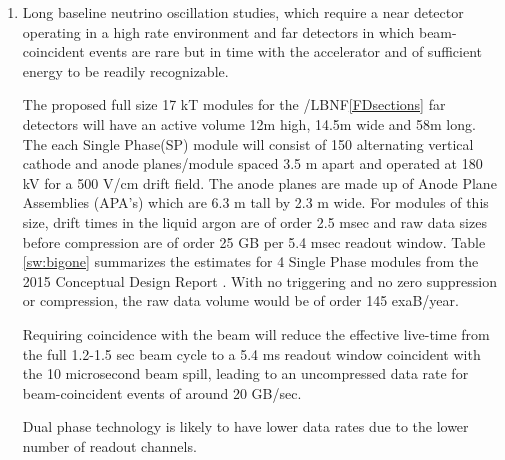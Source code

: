 \begin{enumerate}
\item Long baseline neutrino oscillation studies, which require a near detector operating in a high rate environment and far detectors in which beam-coincident events are rare but in time with the accelerator and of sufficient energy to be readily recognizable.  

The proposed  full size 17 kT modules for the  /LBNF\ref{FDsections} far detectors will  have an active volume 12m high, 14.5m wide and 58m long.  The each Single Phase(SP) module will consist of
150 alternating vertical cathode and anode planes/module  spaced 3.5 m apart and operated at 180 kV for a 500 V/cm drift field.  The anode planes are made up of Anode Plane Assemblies  (APA's) which are 6.3 m tall by 2.3 m wide. %
For modules of this size, drift times in the liquid argon are of order 2.5 msec and raw data sizes before compression are of order 25 GB per 5.4 msec readout window. Table \ref{sw:bigone} summarizes the estimates for 4 Single Phase modules from the 2015 Conceptual Design Report \cite{cdr-annex-rates}.  With no triggering and no zero suppression or compression, the raw data volume would be of order 145 exaB/year. 

Requiring  coincidence with the  beam will reduce the effective live-time from the full 1.2-1.5 sec beam cycle to a 5.4 ms readout window coincident with the 10 microsecond beam spill, leading to an uncompressed data rate for beam-coincident events of around 20 GB/sec.

Dual phase technology is likely to have lower data rates due to the lower number of readout channels. 




\end{enumerate}
